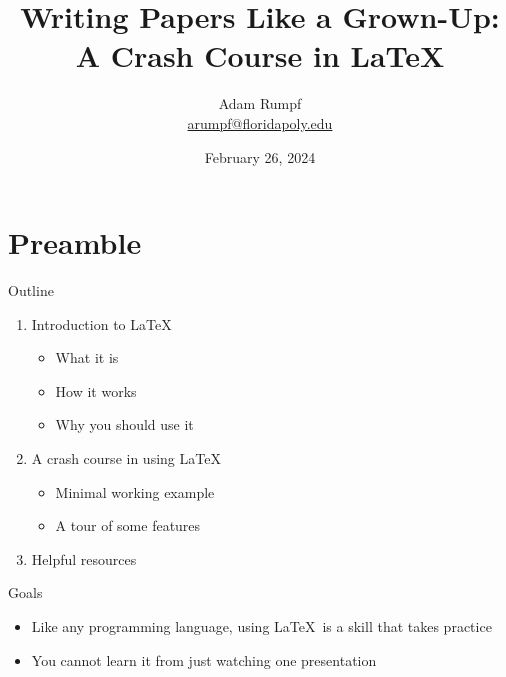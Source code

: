 \documentclass{beamer} %
\title{Writing Papers Like a Grown-Up:\\ A Crash Course in \LaTeX}
\author{Adam Rumpf\\{\footnotesize \href{mailto:arumpf@floridapoly.edu}{arumpf@floridapoly.edu}}}
\institute{Florida Polytechnic University\\Department of Applied Mathematics}
\date{February 26, 2024}
\begin{document}
\begin{frame}

\titlepage

\end{frame}

\section{Preamble}

\begin{frame}{Outline}

\begin{enumerate}
	\item Introduction to \LaTeX
	\begin{itemize}
		\item What it is
		\item How it works
		\item Why you should use it
	\end{itemize}
	\item A crash course in using \LaTeX
	\begin{itemize}
		\item Minimal working example
		\item A tour of some features
	\end{itemize}
	\item Helpful resources
\end{enumerate}

\end{frame}

\begin{frame}{Goals}

\begin{itemize}
	\item Like any programming language, using \LaTeX\ is a skill that takes practice
	\item You cannot learn it from just watching one presentation
\end{itemize}

\end{frame}
\end{document}
